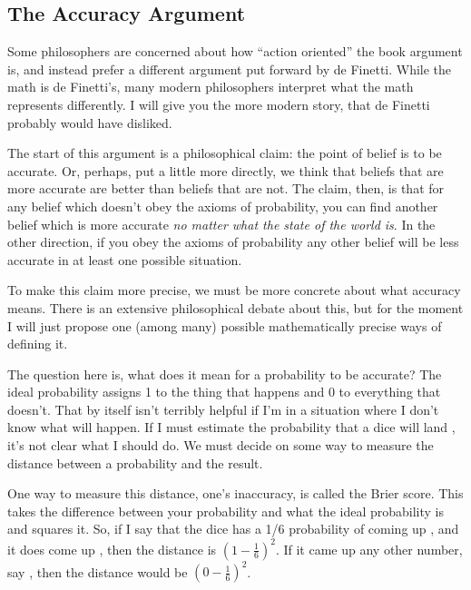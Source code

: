 \subsection{The Accuracy Argument}
\label{s:synchronic-accuracy}

Some philosophers are concerned about how ``action oriented'' the book argument is, and instead prefer a different argument put forward by de Finetti. While the math is de Finetti's, many modern philosophers interpret what the math represents differently. I will give you the more modern story, that de Finetti probably would have disliked.

The start of this argument is a philosophical claim: the point of belief is to be accurate.  Or, perhaps, put a little more directly, we think that beliefs that are more accurate are better than beliefs that are not.  The claim, then, is that for any belief which doesn't obey the axioms of probability, you can find another belief which is more accurate {\it no matter what the state of the world is}.  In the other direction, if you obey the axioms of probability any other belief will be less accurate in at least one possible situation.  

To make this claim more precise, we must be more concrete about what accuracy means.  There is an extensive philosophical debate about this, but for the moment I will just propose one (among many) possible mathematically precise ways of defining it.

The question here is, what does it mean for a probability to be accurate?  The ideal probability assigns 1 to the thing that happens and 0 to everything that doesn't.  That by itself isn't terribly helpful if I'm in a situation where I don't know what will happen.  If I must estimate the probability that a dice will land , it's not clear what I should do.  We must decide on some way to measure the distance between a probability and the result.  

One way to measure this distance, one's inaccuracy, is called the Brier score.  This takes the difference between your probability and what the ideal probability is and squares it. So, if I say that the dice has a 1/6 probability of coming up , and it does come up , then the distance is $(1-\frac{1}{6})^2$.  If it came up any other number, say , then the distance would be $(0-\frac{1}{6})^2$.

